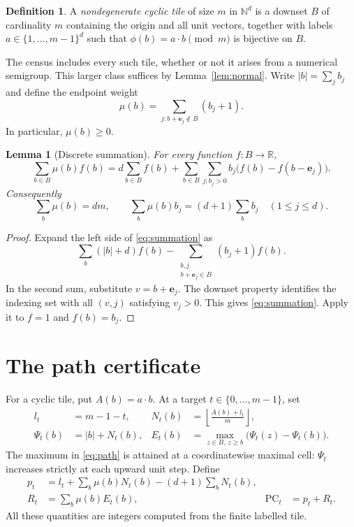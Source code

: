\documentclass[11pt]{article}
\newtheorem{lemma}[theorem]{Lemma}
\theoremstyle{definition}
\newtheorem{definition}[theorem]{Definition}
\theoremstyle{remark}
\newcommand{\N}{\mathbb{N}}
\newcommand{\PC}{\operatorname{PC}}
\begin{document}
\begin{definition}
A \emph{nondegenerate cyclic tile} of size $m$ in $\N^d$ is a downset
$B$ of cardinality $m$ containing the origin and all unit vectors,
together with labels $a\in\{1,\ldots,m-1\}^d$ such that
$\phi(b)=a\cdot b\pmod m$ is bijective on $B$.
\end{definition}

The census includes every such tile, whether or not it arises from a
numerical semigroup. This larger class suffices by Lemma~\ref{lem:normal}.
Write $|b|=\sum_jb_j$ and define the endpoint weight
\begin{equation}\label{eq:mu}
\mu(b)=\sum_{j:b+\mathbf e_j\notin B}(b_j+1).
\end{equation}
In particular, $\mu(b)\ge0$.

\begin{lemma}[Discrete summation]\label{lem:summation}
For every function $f:B\to\mathbb R$,
\begin{equation}\label{eq:summation}
\sum_{b\in B}\mu(b)f(b)
=d\sum_{b\in B}f(b)
+\sum_{b\in B}\sum_{j:b_j>0}b_j\bigl(f(b)-f(b-\mathbf e_j)\bigr).
\end{equation}
Consequently
\begin{equation}\label{eq:moments}
\sum_b\mu(b)=dm,\qquad
\sum_b\mu(b)b_j=(d+1)\sum_bb_j\quad(1\le j\le d).
\end{equation}
\end{lemma}
\begin{proof}
Expand the left side of \eqref{eq:summation} as
\[
\sum_b(|b|+d)f(b)
-\sum_{\substack{b,j\\b+\mathbf e_j\in B}}(b_j+1)f(b).
\]
In the second sum, substitute $v=b+\mathbf e_j$. The downset property
identifies the indexing set with all $(v,j)$ satisfying $v_j>0$.
This gives \eqref{eq:summation}. Apply it to $f=1$ and $f(b)=b_j$.
\end{proof}

\section{The path certificate}

For a cyclic tile, put $A(b)=a\cdot b$. At a target
$t\in\{0,\ldots,m-1\}$, set
\begin{align}
l_t&=m-1-t,& N_t(b)&=\left\lfloor\frac{A(b)+l_t}{m}\right\rfloor,
\label{eq:carry}\\
\Psi_t(b)&=|b|+N_t(b),&
E_t(b)&=\max_{z\in B,\,z\ge b}\bigl(\Psi_t(z)-\Psi_t(b)\bigr).
\label{eq:path}
\end{align}
The maximum in \eqref{eq:path} is attained at a coordinatewise maximal
cell: $\Psi_t$ increases strictly at each upward unit step. Define
\begin{align}
p_t&=l_t+\sum_b\mu(b)N_t(b)-(d+1)\sum_bN_t(b),\label{eq:p}\\
R_t&=\sum_b\mu(b)E_t(b),& \PC_t&=p_t+R_t.\label{eq:pc}
\end{align}
All these quantities are integers computed from the finite labelled tile.
\end{document}
